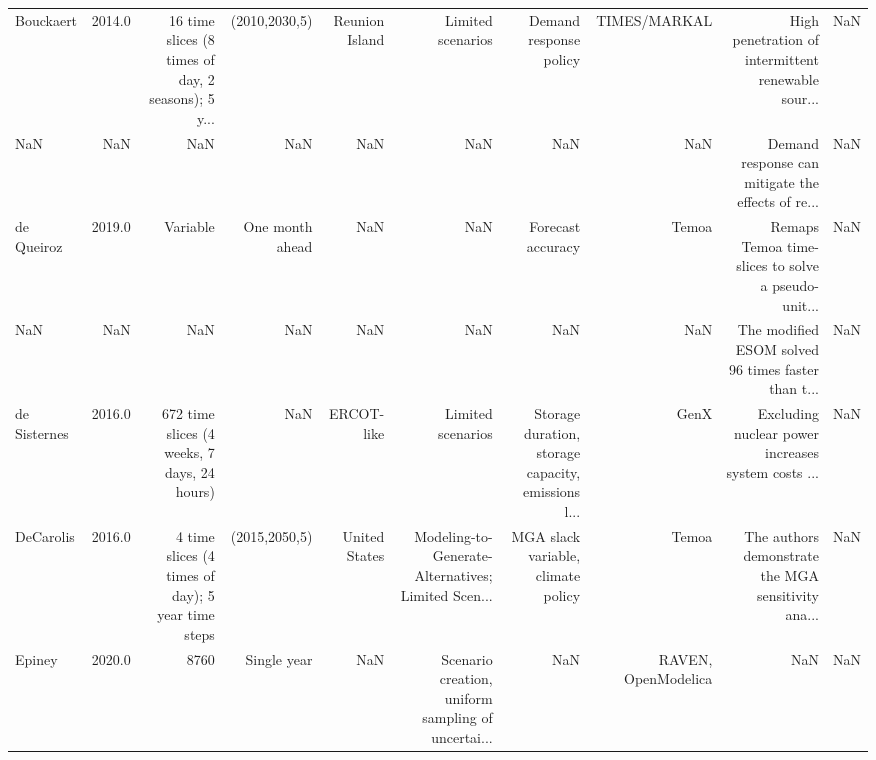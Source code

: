 \begin{tabular}{lrrrrrrrrr}
   Bouckaert & 2014.0 & 16 time slices (8 times of day, 2 seasons); 5 y... &   (2010,2030,5) &                        Reunion Island &                                  Limited scenarios &                             Demand response policy &                      TIMES/MARKAL & High penetration of intermittent renewable sour... &     NaN \\
         NaN &    NaN &                                                NaN &             NaN &                                   NaN &                                                NaN &                                                NaN &                               NaN &  Demand response can mitigate the effects of re... &     NaN \\
  de Queiroz & 2019.0 &                                           Variable & One month ahead &                                   NaN &                                                NaN &                                  Forecast accuracy &                             Temoa & Remaps Temoa time-slices to solve a pseudo-unit... &     NaN \\
         NaN &    NaN &                                                NaN &             NaN &                                   NaN &                                                NaN &                                                NaN &                               NaN & The modified ESOM solved 96 times faster than t... &     NaN \\
de Sisternes & 2016.0 &        672 time slices (4 weeks, 7 days, 24 hours) &             NaN &                            ERCOT-like &                                  Limited scenarios & Storage duration, storage capacity, emissions l... &                              GenX & Excluding nuclear power increases system costs ... &     NaN \\
   DeCarolis & 2016.0 &  4 time slices (4 times of day); 5 year time steps &   (2015,2050,5) &                         United States & Modeling-to-Generate-Alternatives; Limited Scen... &                 MGA slack variable, climate policy &                             Temoa & The authors demonstrate the MGA sensitivity ana... &     NaN \\
      Epiney & 2020.0 &                                               8760 &     Single year &                                   NaN & Scenario creation, uniform sampling of uncertai... &                                                NaN &               RAVEN, OpenModelica &                                                NaN &     NaN \\

\end{tabular}
